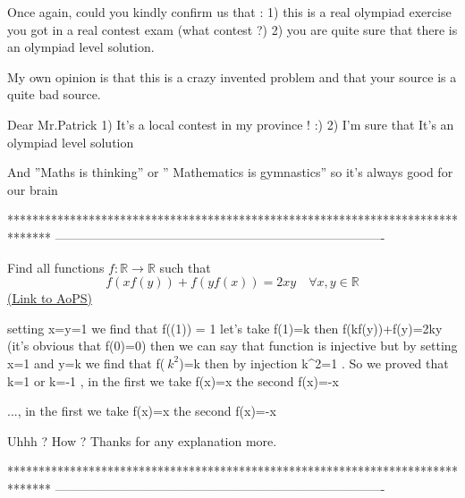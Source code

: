 \begin{solution}
	\begin{tcolorbox}
Once again, could you kindly confirm us that :
1) this is a real olympiad exercise you got in a real contest \/ exam (what contest ?)
2) you are quite sure that there is an olympiad level solution.

My own opinion is that this is a crazy invented problem and that your source is a quite bad source.\end{tcolorbox}
Dear Mr.Patrick
1) It's a local contest in my province ! :)
2) I'm sure that It's an olympiad level solution

And ''Maths is thinking'' or '' Mathematics is gymnastics''  so it's always good for our brain 
\end{solution}
*******************************************************************************
-------------------------------------------------------------------------------

\begin{problem}
	Find all functions $f:\mathbb R\to \mathbb R$ such that 
\[f(xf(y))+f(yf(x))=2xy \quad \forall x,y\in \mathbb R\]
	\flushright \href{https://artofproblemsolving.com/community/c6h570625}{(Link to AoPS)}
\end{problem}



\begin{solution}
	setting x=y=1 we find that f((1)) = 1 let's take f(1)=k then 
f(kf(y))+f(y)=2ky (it's obvious that f(0)=0)  then we can say that function is injective  but
by setting x=1 and y=k we find that f($\ k^2$)=k then by injection k^2=1 . So we proved that k=1 or k=-1 , in the first we take f(x)=x the second f(x)=-x
\end{solution}



\begin{solution}
	\begin{tcolorbox}..., in the first we take f(x)=x the second f(x)=-x\end{tcolorbox}
Uhhh ? How ?
Thanks for any explanation more.
\end{solution}
*******************************************************************************
-------------------------------------------------------------------------------

